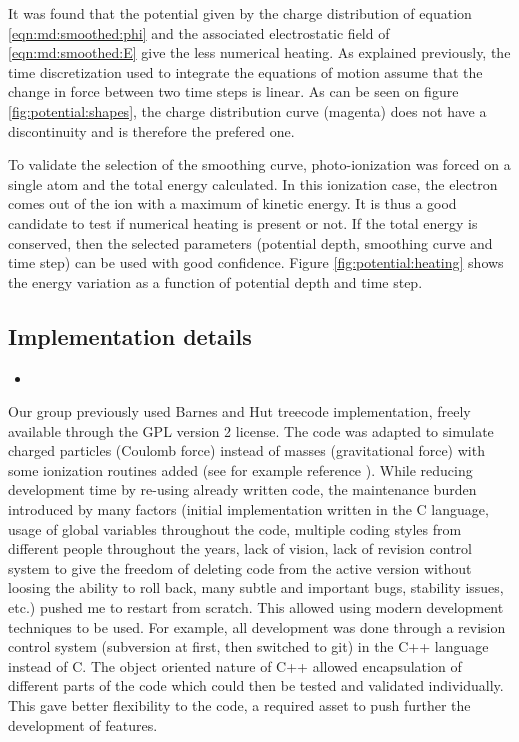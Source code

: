 It was found that the potential given by the charge distribution of equation
\eqref{eqn:md:smoothed:phi} and the associated electrostatic field of
\eqref{eqn:md:smoothed:E} give the less numerical heating. As explained
previously, the time discretization used to integrate the equations of motion
assume that the change in force between two time steps is linear. As can be
seen on figure \ref{fig:potential:shapes}, the charge distribution curve
(magenta) does not have a discontinuity and is therefore the prefered one.

To validate the selection of the smoothing curve, photo-ionization was forced
on a single atom and the total energy calculated. In this ionization case, the
electron comes out of the ion with a maximum of kinetic energy. It is thus a
good candidate to test if numerical heating is present or not. If the total
energy is conserved, then the selected parameters (potential depth, smoothing
curve and time step) can be used with good confidence. Figure
\ref{fig:potential:heating} shows the energy variation as a function
of potential depth and time step.




\subsection{Implementation details}
\begin{itemize}
\item {}
\end{itemize}

Our group previously used Barnes and Hut treecode implementation,
freely available\cite{treecode} through the GPL version 2 license. The code was adapted
to simulate charged particles (Coulomb force) instead of masses (gravitational
force) with some ionization routines added (see for example reference
\cite{Jungreuthmayer2005}). While reducing development time by re-using already
written code, the maintenance burden introduced by many factors (initial
implementation written in the C language, usage of global variables
throughout the code, multiple coding styles from different people throughout
the years, lack of vision, lack of revision control system to give the freedom
of deleting code from the active version without loosing the ability to roll
back, many subtle and important bugs, stability issues, etc.) pushed me
to restart from scratch. This allowed using modern development techniques to be
used. For example, all development was done through a revision control system
(subversion\cite{svn} at first, then switched to git\cite{git}) in the C++
language instead of C. The object oriented nature of C++ allowed encapsulation
of different parts of the code which could then be tested and validated
individually. This gave better flexibility to the code, a required asset to
push further the development of features.

